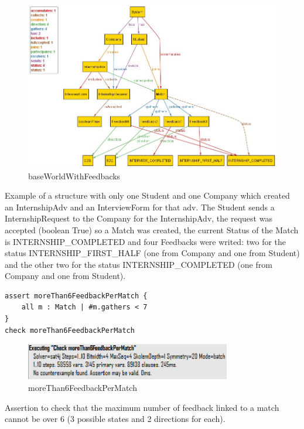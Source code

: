 \begin{figure}[h]
    \centering
    \includegraphics[width=1\textwidth]{Images/AlloyModel_images/WorldWithFeedbacks.png}
    \caption{baseWorldWithFeedbacks}
    \label{fig:figure2}
\end{figure}
Example of a structure with only one Student and one Company which created an InternshipAdv and an InterviewForm for that adv. The Student sends a InternshipRequest to the Company for the InternshipAdv, the request was accepted (boolean True) so a Match was created, the current Status of the Match is INTERNSHIP\_COMPLETED and four Feedbacks were writed: two for the status INTERNSHIP\_FIRST\_HALF (one from Company and one from Student) and the other two for the status INTERNSHIP\_COMPLETED (one from Company and one from Student).\newline


\begin{lstlisting}
assert moreThan6FeedbackPerMatch {
	all m : Match | #m.gathers < 7
}
check moreThan6FeedbackPerMatch
\end{lstlisting}

\begin{figure}[h]
    \centering
    \includegraphics[width=0.8\textwidth]{Images/AlloyModel_images/moreThan6FeedbackPerMatch.png}
    \caption{moreThan6FeedbackPerMatch}
    \label{fig:figure2}
\end{figure}
Assertion to check that the maximum number of feedback linked to a match cannot be over 6 (3 possible states and 2 directions for each).

